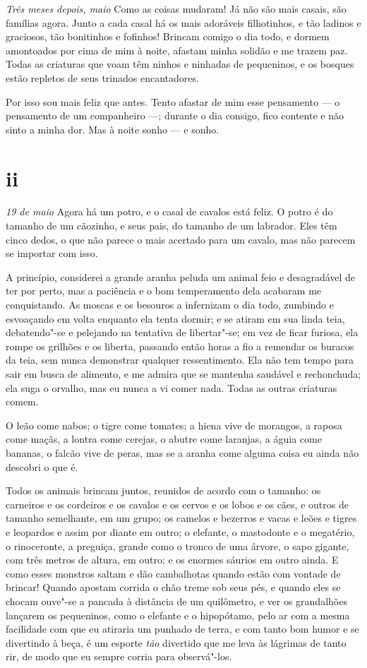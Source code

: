 \textit{Três meses depois, maio} Como as coisas mudaram! Já não são mais casais, são famílias agora.       
Junto a cada casal há os mais adoráveis filhotinhos, e tão ladinos e graciosos, tão bonitinhos e fofinhos!
Brincam comigo o dia todo, e dormem amontoados por cima de mim à noite, afastam minha solidão
e me trazem paz. Todas as criaturas que voam têm ninhos e ninhadas de pequeninos, e os bosques
estão repletos de seus trinados encantadores.

Por isso sou mais feliz que antes. Tento afastar de mim esse pensamento --- o pensamento
de um companheiro ---; durante o dia consigo, fico contente e não sinto a minha dor. Mas
à noite sonho --- e sonho.

\section{ii}

\textit{19 de maio} Agora há um potro, e o casal de cavalos está feliz. O potro é do tamanho de um cãozinho,
e seus pais, do tamanho de um labrador. Eles têm cinco dedos, o que não parece o mais acertado
para um cavalo, mas não parecem se importar com isso.

A princípio, considerei a grande aranha peluda um animal feio e desagradável de ter por perto,
mas a paciência e o bom temperamento dela acabaram me conquistando. As moscas e os besouros
a infernizam o dia todo, zumbindo e esvoaçando em volta enquanto ela tenta dormir; e se atiram
em sua linda teia, debatendo"-se e pelejando na tentativa de libertar"-se; em vez de ficar furiosa, ela
rompe os grilhões e os liberta, passando então horas a fio a remendar os buracos da teia, sem
nunca demonstrar qualquer ressentimento. Ela não tem tempo para sair em busca de alimento, e me admira
que se mantenha saudável e rechonchuda; ela suga o orvalho, mas eu nunca a vi comer nada. Todas
as outras criaturas comem.

O leão come nabos; o tigre come tomates; a hiena vive de morangos, a raposa come maçãs, a lontra
come cerejas, o abutre come laranjas, a águia come bananas, o falcão vive de peras,
mas se a aranha come alguma coisa eu ainda não descobri o que é.

Todos os animais brincam juntos, reunidos de acordo com o tamanho: os carneiros e os cordeiros e os cavalos e os cervos
e os lobos e os cães, e outros de tamanho semelhante, em um grupo; os camelos e bezerros e vacas e leões e tigres e leopardos e assim por diante em outro;
o elefante, o mastodonte e o megatério, o rinoceronte, a preguiça, grande como o tronco de uma árvore, o sapo gigante, com três metros de altura,
em outro; e os enormes sáurios em outro ainda. E como esses monstros saltam e dão cambalhotas quando estão com vontade de brincar!
Quando apostam corrida o chão treme sob seus pés, e quando eles se chocam ouve"-se a pancada à distância de um quilômetro, e ver
os grandalhões lançarem os pequeninos, como o elefante e o hipopótamo, pelo ar com a mesma facilidade com que eu atiraria um punhado de terra,
e com tanto bom humor e se divertindo à beça, é um esporte \textit{tão} divertido que me leva às lágrimas de tanto rir, de modo que
eu sempre corria para observá"-los.

